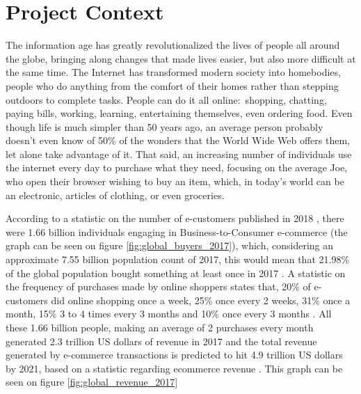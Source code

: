 \documentclass[12pt,a4paper,twoside]{report}
\begin{document}
\setcounter{page}{1}

\tableofcontents
\newpage

\setcounter{page}{1}


\chapter{Project Context}
\pagestyle{headings}

The information age has greatly revolutionalized the lives of people all around the globe, bringing along changes that made lives easier, but also more difficult at the same time. The Internet has transformed modern society into homebodies, people who do anything from the comfort of their homes rather than stepping outdoors to complete tasks. People can do it all online: shopping, chatting, paying bills, working, learning, entertaining themselves, even ordering food. Even though life is much simpler than 50 years ago, an average person probably doesn't even know of 50\% of the wonders that the World Wide Web offers them, let alone take advantage of it. That said, an increasing number of individuals use the internet every day to purchase what they need, focusing on the average Joe, who open their browser wishing to buy an item, which, in today's world can be an electronic, articles of clothing, or even groceries.

According to a statistic on the number of e-customers published in 2018 \cite{global_buyers_2017}, there were 1.66 billion individuals engaging in Business-to-Consumer e-commerce (the graph can be seen on figure \ref{fig:global_buyers_2017}), which, considering an approximate 7.55 billion population count of 2017, this would mean that 21.98\% of the global population bought something at least once in 2017 . A statistic on the frequency of purchases made by online shoppers \cite{global_frequency_2018} states that, 20\% of e-customers did online shopping once a week, 25\% once every 2 weeks, 31\% once a month, 15\% 3 to 4 times every 3 months and 10\% once every 3 months . All these 1.66 billion people, making an average of 2 purchases every month generated 2.3 trillion US dollars of revenue in 2017 and the total revenue generated by e-commerce transactions is predicted to hit 4.9 trillion US dollars by 2021, based on a statistic regarding ecommerce revenue \cite{global_revenue_2017}. This graph can be seen on figure \ref{fig:global_revenue_2017}
\end{document}
